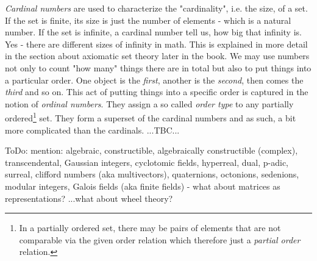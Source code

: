 \medskip
\emph{Cardinal numbers} are used to characterize the "cardinality", i.e. the size, of a set. If the set is finite, its size is just the number of elements - which is a natural number. If the set is infinite, a cardinal number tell us, how big that infinity is. Yes - there are different sizes of infinity in math. This is explained in more detail in the section about axiomatic set theory later in the book. We may use numbers not only to count "how many" things there are in total but also to put things into a particular order. One object is the \emph{first}, another is the \emph{second}, then comes the \emph{third} and so on. This act of putting things into a specific order is captured in the notion of \emph{ordinal numbers}. They assign a so called \emph{order type} to any partially ordered\footnote{In a partially ordered set, there may be pairs of elements that are not comparable via the given order relation which therefore just a \emph{partial order} relation.} set. They form a superset of the cardinal numbers and as such, a bit more complicated than the cardinals. ...TBC...

\medskip
ToDo: mention: algebraic, constructible, algebraically constructible (complex), transcendental, Gaussian integers, cyclotomic fields, hyperreal, dual, p-adic, surreal, clifford numbers (aka multivectors), quaternions, octonions, sedenions, modular integers, Galois fields (aka finite fields) - what about matrices as representations? ...what about wheel theory?




